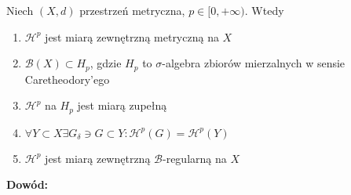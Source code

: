 \begin{tw}
	Niech $(X,d)$ przestrzeń metryczna, $p \in [0, +\infty)$. Wtedy
	\begin{enumerate}
		\item $\mathcal{H}^p$ jest miarą zewnętrzną metryczną na $X$
		\item $\mathcal{B}(X) \subset H_p$, gdzie $H_p$ to $\sigma$-algebra zbiorów mierzalnych w sensie Caretheodory'ego
		\item $\mathcal{H}^p$ na $H_p$ jest miarą zupełną
		\item $\forall Y \subset X \exists G_{\delta} \ni G \subset Y: \mathcal{H}^p(G) = \mathcal{H}^p(Y)$
		\item $\mathcal{H}^p$ jest miarą zewnętrzną $\mathcal{B}$-regularną na $X$
	\end{enumerate}

	\textbf{Dowód:} \citep[3.51]{Tworzewski}
\end{tw}